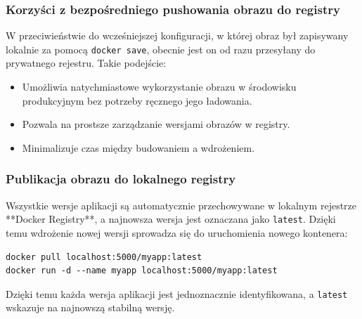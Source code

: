 \subsubsection{Korzyści z bezpośredniego pushowania obrazu do registry}

W przeciwieństwie do wcześniejszej konfiguracji, w której obraz był zapisywany lokalnie za pomocą \texttt{docker save}, obecnie jest on od razu przesyłany do prywatnego rejestru. Takie podejście:
\begin{itemize}
    \item Umożliwia natychmiastowe wykorzystanie obrazu w środowisku produkcyjnym bez potrzeby ręcznego jego ładowania.
    \item Pozwala na prostsze zarządzanie wersjami obrazów w registry.
    \item Minimalizuje czas między budowaniem a wdrożeniem.
\end{itemize}

\subsubsection{Publikacja obrazu do lokalnego registry}

Wszystkie wersje aplikacji są automatycznie przechowywane w lokalnym rejestrze **Docker Registry**, a najnowsza wersja jest oznaczana jako \texttt{latest}. Dzięki temu wdrożenie nowej wersji sprowadza się do uruchomienia nowego kontenera:

\begin{verbatim}
docker pull localhost:5000/myapp:latest
docker run -d --name myapp localhost:5000/myapp:latest
\end{verbatim}

Dzięki temu każda wersja aplikacji jest jednoznacznie identyfikowana, a \texttt{latest} wskazuje na najnowszą stabilną wersję.